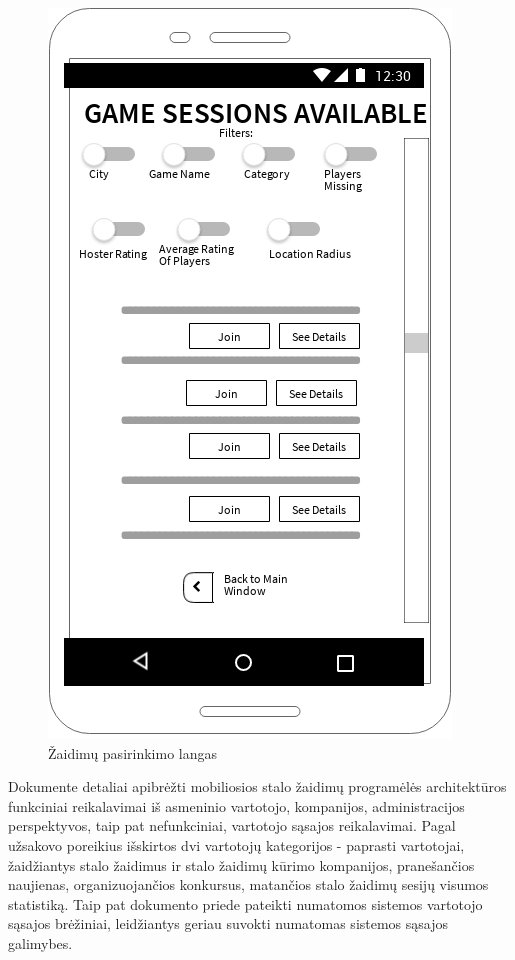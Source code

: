 \documentclass{VUMIFPSkursinis}
\begin{document}
\begin{figure}[H]
	\centering
	\includegraphics[scale=0.9]{img/game_sessions_view}
	\caption{Žaidimų pasirinkimo langas}
	\label{img:game_sessions_view}
\end{figure}

Dokumente detaliai apibrėžti mobiliosios stalo žaidimų programėlės architektūros funkciniai reikalavimai iš asmeninio vartotojo, kompanijos, administracijos perspektyvos, taip pat nefunkciniai, vartotojo sąsajos reikalavimai. Pagal užsakovo poreikius išskirtos dvi vartotojų kategorijos - paprasti vartotojai, žaidžiantys stalo žaidimus ir stalo žaidimų kūrimo kompanijos, pranešančios naujienas, organizuojančios konkursus, matančios stalo žaidimų sesijų visumos statistiką. Taip pat dokumento priede pateikti numatomos sistemos vartotojo sąsajos brėžiniai, leidžiantys geriau suvokti numatomas sistemos sąsajos galimybes.
\end{document}
